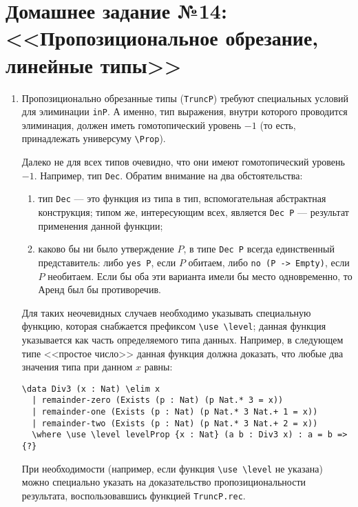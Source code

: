 \documentclass[10pt,a4paper,oneside]{article}
\begin{document}
\section*{Домашнее задание №14: <<Пропозициональное обрезание, линейные типы>>}
\begin{enumerate}
\item Пропозиционально обрезанные типы (\verb!TruncP!) требуют специальных условий для элиминации \verb!inP!.
А именно, тип выражения, внутри которого проводится элиминация, должен иметь гомотопический 
уровень $-1$ (то есть, принадлежать универсуму \verb!\Prop!).

Далеко не для всех типов очевидно, что они имеют гомотопический уровень $-1$. 
Например, тип \verb!Dec!. Обратим внимание на два обстоятельства:
\begin{enumerate}
\item тип \verb!Dec! --- это функция из типа в тип, вспомогательная абстрактная конструкция; 
типом же, интересующим всех, является \verb!Dec P! --- результат применения данной функции;
\item каково бы ни было утверждение $P$, в типе \verb!Dec P!
всегда единственный представитель: либо \verb!yes P!, если $P$ обитаем, 
либо \verb!no (P -> Empty)!, если $P$ необитаем. 
Если бы оба эти варианта имели бы место одновременно, то Аренд был бы противоречив.
\end{enumerate}

Для таких неочевидных случаев необходимо указывать специальную функцию, которая снабжается префиксом
\verb!\use \level!; данная функция указывается как часть определяемого типа данных. Например, в 
следующем типе <<простое число>> данная функция должна доказать, что любые два значения типа при данном $x$ равны:

\begin{verbatim}
\data Div3 (x : Nat) \elim x
  | remainder-zero (Exists (p : Nat) (p Nat.* 3 = x))
  | remainder-one (Exists (p : Nat) (p Nat.* 3 Nat.+ 1 = x))
  | remainder-two (Exists (p : Nat) (p Nat.* 3 Nat.+ 2 = x))
  \where \use \level levelProp {x : Nat} (a b : Div3 x) : a = b => {?}
\end{verbatim}

При необходимости (например, если функция \verb!\use \level! не указана) можно специально 
указать на доказательство пропозициональности результата, воспользовавшись 
функцией \verb!TruncP.rec!.


\end{enumerate}
\end{document}
